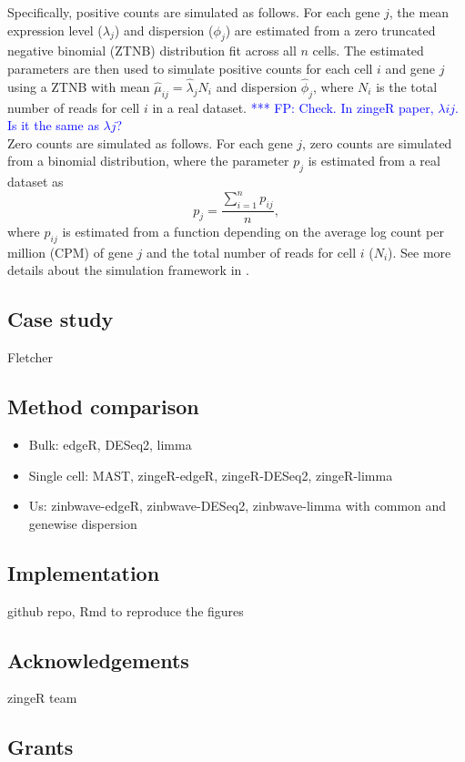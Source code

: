\documentclass{article}
\newcommand{\fp}[1]{\textcolor{blue}{*** FP: #1}}
\begin{document}
Specifically, positive counts are simulated as follows. For each gene $j$, the mean expression level ($\lambda_j$) and dispersion ($\phi_j$) are estimated from a zero truncated negative binomial (ZTNB) distribution fit across all $n$ cells. The estimated parameters are then used to simulate positive counts for each cell $i$ and gene $j$ using a ZTNB with mean $\hat \mu_{ij} = \hat \lambda_{j} N_i$ and dispersion $\hat \phi_j$, where $N_i$ is the total number of reads for cell $i$ in a real dataset. \fp{Check. In zingeR paper, $\lambda{ij}$. Is it the same as $\lambda{j}$?}\\

Zero counts are simulated as follows. For each gene $j$, zero counts are simulated from a binomial distribution, where the parameter $p_j$ is estimated from a real dataset as
$$p_j = \frac{\sum_{i=1}^n p_{ij}}{n},$$
where $p_{ij}$ is estimated from a function depending on the average log count per million (CPM) of gene $j$ and the total number of reads for cell $i$ ($N_i$). See more details about the simulation framework in \cite{VandenBerge2017ZingeR:Applications}.

\subsection*{Case study}
Fletcher

\subsection*{Method comparison}
\begin{itemize}
  \item Bulk: edgeR, DESeq2, limma
  \item Single cell: MAST, zingeR-edgeR, zingeR-DESeq2, zingeR-limma
  \item Us: zinbwave-edgeR, zinbwave-DESeq2, zinbwave-limma with common and genewise dispersion
\end{itemize}

\subsection*{Implementation}
github repo, Rmd to reproduce the figures

\subsection*{Acknowledgements}
zingeR team

\subsection*{Grants}
\end{document}
